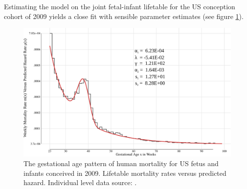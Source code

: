 \documentclass[
  12pt
]{scrartcl}
\begin{document}
Estimating the model on the joint fetal-infant lifetable for the US conception cohort of 2009 yields a close fit with sensible parameter estimates (see figure \ref{fig:us_fimort_2009_mx_predobs}).

\begin{figure}[!htb]
  \centering
  \includegraphics[width = \textwidth]{./fig/us_fimort_2009_mx_predobs.pdf}
  \caption{The gestational age pattern of human mortality for US fetus and infants conceived in 2009. Lifetable mortality rates versus predicted hazard. Individual level data source: \cite{DVS2015}.}
  \label{fig:us_fimort_2009_mx_predobs}
\end{figure}

\clearpage


\sloppy
\printbibliography




\end{document}
